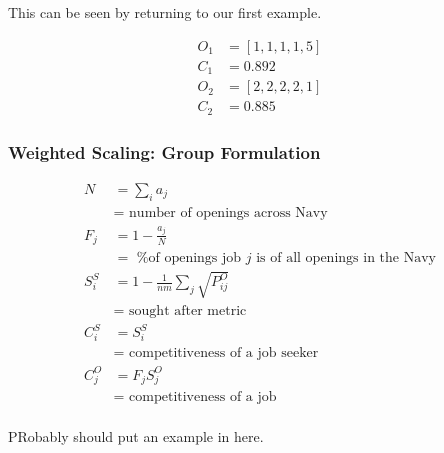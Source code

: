 This can be seen by returning to our first example.

\begin{align}
O_1 &= [1,1,1,1,5] \\
C_1 &= 0.892\\
O_2 &= [2,2,2,2,1] \\
C_2 &= 0.885
\end{align}

\subsubsection{Weighted Scaling: Group Formulation}

\begin{align*}
N &= \sum_i a_j \\
&= \text{ number of openings across Navy}\\
F_j &= 1 - \frac{a_j}{N} \\
&= \text{ \% of openings job $j$ is of all openings in the Navy} \\ 
S^S_i &= 1 - \frac{1}{nm} \sum_j \sqrt{P_{ij}^O} \\
&= \text{ sought after metric} \\
C_i^S &= S^S_i \\
&= \text{ competitiveness of a job seeker} \\
C_j^O &= F_j S^O_j \\
&= \text{ competitiveness of a job} \\
\end{align*}

PRobably should put an example in here.
